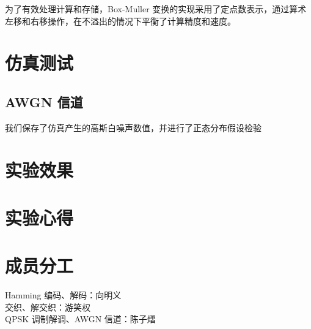 \documentclass[a4paper]{article}  %
\begin{document}
为了有效处理计算和存储，Box-Muller 变换的实现采用了定点数表示，通过算术左移和右移操作，在不溢出的情况下平衡了计算精度和速度。

\section{仿真测试}

\subsection{AWGN 信道}

我们保存了仿真产生的高斯白噪声数值，并进行了正态分布假设检验

\section{实验效果}

\section{实验心得}

\section{成员分工}

Hamming 编码、解码：向明义 \\
交织、解交织：游笑权 \\
QPSK 调制解调、AWGN 信道：陈子熠




\end{document}
